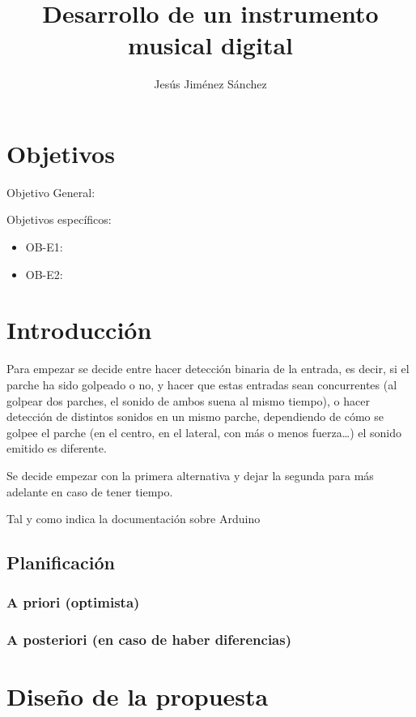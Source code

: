 \documentclass{article}
\title{Desarrollo de un instrumento musical digital}
\author{ Jesús Jiménez Sánchez }
\begin{document}
\maketitle

\section*{Objetivos}
Objetivo General: 

Objetivos específicos:
\begin{itemize}
    \item OB-E1:
    \item OB-E2:
\end{itemize}

\section{Introducción}
Para empezar se decide entre hacer detección binaria de la entrada, es decir, si el parche ha sido golpeado o no, y hacer que estas entradas sean concurrentes (al golpear dos parches, el sonido de ambos suena al mismo tiempo), o hacer detección de distintos sonidos en un mismo parche, dependiendo de cómo se golpee el parche (en el centro, en el lateral, con más o menos fuerza…) el sonido emitido es diferente.

Se decide empezar con la primera alternativa y dejar la segunda para más adelante en caso de tener tiempo.

Tal y como indica la documentación sobre Arduino \cite{DocArduino}

\subsection{Planificación}

 \subsubsection{A priori (optimista)}

 \subsubsection{A posteriori (en caso de haber diferencias)} 
 
 

\section{Diseño de la propuesta}
\end{document}
